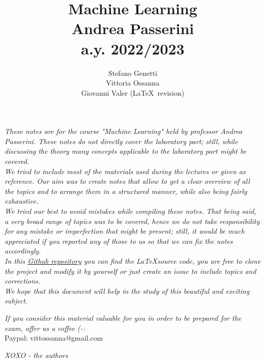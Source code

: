 

\title{\Huge \textbf{Machine Learning\\} \Large{Andrea Passerini\\a.y. 2022/2023}}

\author{Stefano Genetti\\Vittoria Ossanna\\Giovanni Valer (\LaTeX\ revision)}


\maketitle

\newpage
\textit{These notes are for the course "Machine Learning" held by professor Andrea Passerini. These notes do not directly cover the laboratory part; still, while discussing the theory many concepts applicable to the laboratory part might be covered. \\
We tried to include most of the materials used during the lectures or given as reference. Our aim was to create notes that allow to get a clear overview of all the topics and to arrange them in a structured manner, while also being fairly exhaustive.\\
We tried our best to avoid mistakes while compiling these notes. That being said, a very broad range of topics was to be covered, hence we do not take responsibility for any mistake or imperfection that might be present; still, it would be much appreciated if you reported any of those to us so that we can fix the notes accordingly.\\
In this \href{https://github.com/StefanoGenettiUniTN/MachineLearning_Passerini.git}{Github repository} you can find the \LaTeX source code, you are free to clone the project and modify it by yourself or just create an issue to include topics and corrections.\\
We hope that this document will help in the study of this beautiful and exciting subject.}
\newline

\textit{If you consider this material valuable for you in order to be prepared for the exam, offer us a coffee (-:}\\
Paypal: vittossanna@gmail.com
\newline

\textit{XOXO - the authors}

\newpage

\tableofcontents


